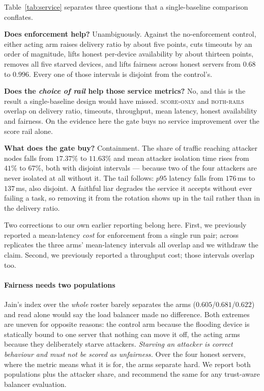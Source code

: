 \documentclass[10pt,twocolumn,letterpaper]{article}
\newcommand{\armscore}{\textsc{score-only}}
\newcommand{\armfull}{\textsc{both-rails}}
\begin{document}
Table~\ref{tab:service} separates three questions that a single-baseline
comparison conflates.

\textbf{Does enforcement help?} Unambiguously. Against the no-enforcement
control, either acting arm raises delivery ratio by about five points, cuts
timeouts by an order of magnitude, lifts honest per-device availability by
about thirteen points, removes all five starved devices, and lifts fairness
across honest servers from $0.68$ to $0.996$. Every one of those intervals is
disjoint from the control's.

\textbf{Does the \emph{choice of rail} help those service metrics?} No, and
this is the result a single-baseline design would have missed. \armscore{} and
\armfull{} overlap on delivery ratio, timeouts, throughput, mean latency,
honest availability and fairness. On the evidence here the gate buys no
service improvement over the score rail alone.

\textbf{What does the gate buy?} Containment. The share of traffic reaching
attacker nodes falls from $17.37\%$ to $11.63\%$ and mean attacker isolation
time rises from $41\%$ to $67\%$, both with disjoint intervals --- because two
of the four attackers are never isolated at all without it. The tail follows:
$p95$ latency falls from $176$\,ms to $137$\,ms, also disjoint. A faithful liar
degrades the service it accepts without ever failing a task, so removing it
from the rotation shows up in the tail rather than in the delivery ratio.

Two corrections to our own earlier reporting belong here. First, we previously
reported a mean-latency \emph{cost} for enforcement from a single run pair;
across replicates the three arms' mean-latency intervals all overlap and we
withdraw the claim. Second, we previously reported a throughput cost; those
intervals overlap too.

\paragraph*{Fairness needs two populations}
Jain's index over the \emph{whole} roster barely separates the arms
($0.605$/$0.681$/$0.622$) and read alone would say the load balancer made no
difference. Both extremes are uneven for opposite reasons: the control arm
because the flooding device is statically bound to one server that nothing can
move it off, the acting arms because they deliberately starve attackers.
\emph{Starving an attacker is correct behaviour and must not be scored as
unfairness.} Over the four honest servers, where the metric means what it is
for, the arms separate hard. We report both populations plus the attacker
share, and recommend the same for any trust-aware balancer evaluation.
\end{document}
